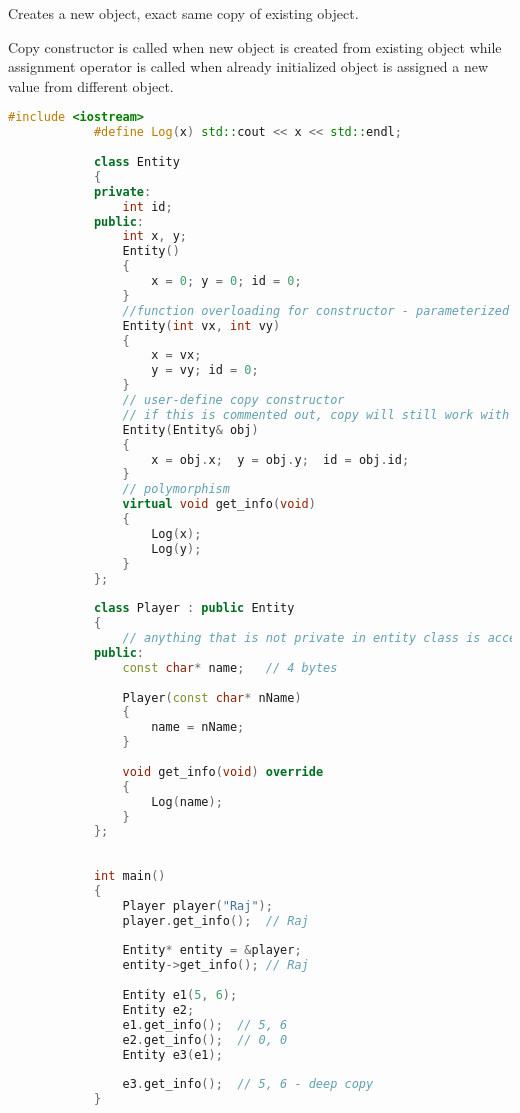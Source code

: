 \documentclass{article}
\begin{document}
        Creates a new object, exact same copy of existing object.
        
        Copy constructor is called when new object is created from existing object while assignment operator is called when already initialized object is assigned a new value from different object. 
        \begin{lstlisting}[language=C++, caption=Copy constructor example]
            #include <iostream>
            #define Log(x) std::cout << x << std::endl;
            
            class Entity
            {
            private:
            	int id;
            public:
            	int x, y;
            	Entity() 
            	{
            		x = 0; y = 0; id = 0;
            	}
            	//function overloading for constructor - parameterized
            	Entity(int vx, int vy)
            	{
            		x = vx;
            		y = vy; id = 0;
            	}
            	// user-define copy constructor
            	// if this is commented out, copy will still work with same syntax as shown in last line in main (e3 definition), but compiler does a shallow copy and not a deep copy.
            	Entity(Entity& obj)
            	{
            		x = obj.x;	y = obj.y;	id = obj.id;
            	}
            	// polymorphism
            	virtual void get_info(void)
            	{
            		Log(x);
            		Log(y);
            	}
            };
            
            class Player : public Entity
            {
            	// anything that is not private in entity class is accessible by player
            public:
            	const char* name;	// 4 bytes
            
            	Player(const char* nName)
            	{
            		name = nName;
            	}
            
            	void get_info(void) override
            	{
            		Log(name);
            	}
            };
            
            
            int main()
            {
            	Player player("Raj");
            	player.get_info();  // Raj
            	
            	Entity* entity = &player;
            	entity->get_info(); // Raj
            
            	Entity e1(5, 6); 
            	Entity e2;
            	e1.get_info();	// 5, 6
            	e2.get_info();	// 0, 0
            	Entity e3(e1);
            	
            	e3.get_info();	// 5, 6 - deep copy
            }

            
        \end{lstlisting}
        
\end{document}
